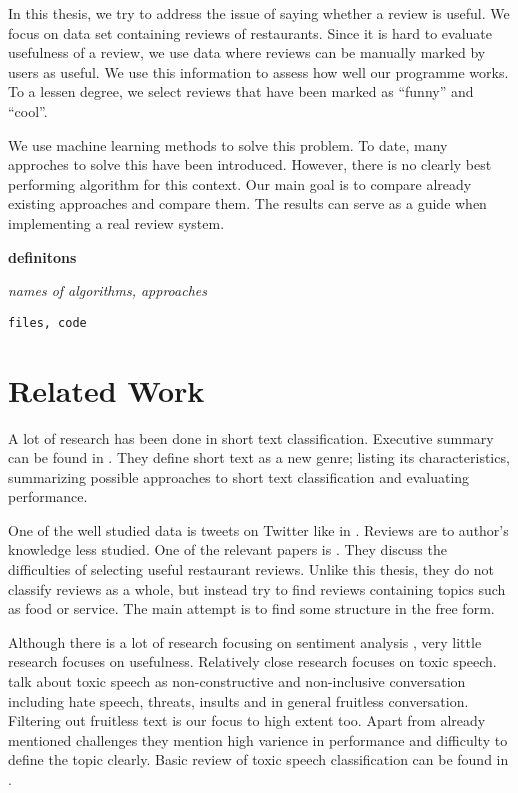 In this thesis, we try to address the issue of saying whether a review is useful.
We focus on data set containing reviews of restaurants.
Since it is hard to evaluate usefulness of a review, we use data where reviews can be manually marked by users as useful.
We use this information to assess how well our programme works.
To a lessen degree, we select reviews that have been marked as ``funny'' and ``cool''.

We use machine learning methods to solve this problem.
To date, many approches to solve this have been introduced.
However, there is no clearly best performing algorithm for this context.
Our main goal is to compare already existing approaches and compare them.
The results can serve as a guide when implementing a real review system.





{\bf definitons}

{\it names of algorithms, approaches}

\texttt{files, code}



\section{Related Work}

A lot of research has been done in short text classification.
Executive summary can be found in \citet{Song14}.
They define short text as a new genre; listing its characteristics, summarizing possible approaches to short text classification and evaluating performance.

One of the well studied data is tweets on Twitter like in \citep{sriram2010short}.
Reviews are to author's knowledge less studied.
One of the relevant papers is \citet{ganu2009beyond}.
They discuss the difficulties of selecting useful restaurant reviews.
Unlike this thesis, they do not classify reviews as a whole, but instead try to find reviews containing topics such as food or service.
The main attempt is to find some structure in the free form.

Although there is a lot of research focusing on sentiment analysis ,
very little research focuses on usefulness.
Relatively close research focuses on toxic speech.
\citet{van2018challenges} talk about toxic speech as non-constructive and non-inclusive conversation including hate speech, threats, insults and in general fruitless conversation.
Filtering out fruitless text is our focus to high extent too.
Apart from already mentioned challenges they mention high varience in performance and difficulty to define the topic clearly.
Basic review of toxic speech classification can be found in \citet{gunasekara2018review}.
